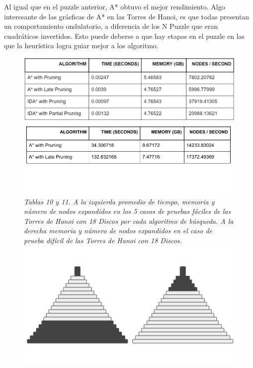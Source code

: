 \documentclass[a4paper,10pt]{article}
\begin{document}
    Al igual que en el puzzle anterior, A* obtuvo el mejor rendimiento. Algo interesante
    de las gr\'asficas de A* en las Torres de Hanoi, es que todas presentan un 
    comportamiento ondulatorio, a diferencia de los N Puzzle que eran cuadr\'aticos
    invertidos. Esto puede deberse a que hay etapas en el puzzle en las que la heur\'istica
    logra guiar mejor a los algoritmo.
    
    \begin{figure}[t!]
      \centering
      \includegraphics[scale=0.32]{hanois18D/18h_tabla_prom.jpg}
      \includegraphics[scale=0.3]{hanois18D/tabla_hard.png}\\
      \textit{\small{Tablas 10 y 11. A la izquierda promedio de tiempo, memoria y 
      n\'umero de nodos expandidos en los 5 casos de pruebas f\'aciles de las Torres de Hanoi 
      con 18 Discos por cada algoritmo de b\'usqueda. A la derecha memoria y
      n\'umero de nodos expandidos en el caso de prueba dif\'icil de las Torres
      de Hanoi con 18 Discos.}}\\
      \includegraphics[scale=0.2]{hanois18D/pdb.png}

\end{figure}
\end{document}
